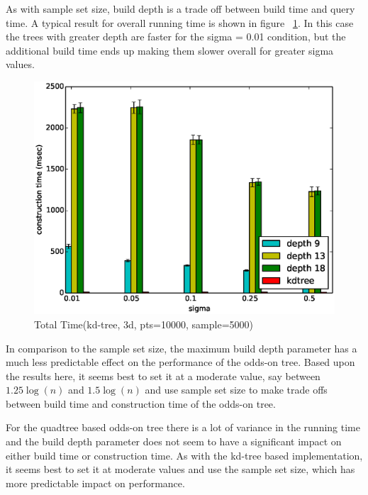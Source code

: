 \documentclass[mcs]{scsthesis}
\begin{document}
As with sample set size, build depth is a trade off between build time and query
time. A typical result for overall running time is shown in figure
~\ref{fig:max_build_depth_total}. In this case the trees with greater depth are
faster for the sigma = 0.01 condition, but the additional build time ends up
making them slower overall for greater sigma values. 

\begin{figure}
\begin{center}
\includegraphics[scale=0.5]{diagrams/kt_3d_pts10000_sample5000_ctime.eps}
\caption{Total Time(kd-tree, 3d, pts=10000, sample=5000)}
\label{fig:max_build_depth_total}
\end{center}
\end{figure}

In comparison to the sample set size, the maximum build depth parameter has
a much less predictable effect on the performance of the odds-on tree. Based
upon the results here, it seems best to set it at a moderate value, say between
$1.25\log(n)$ and $1.5\log(n)$ and use sample set size to make trade offs
between build time and construction time of the odds-on tree.

For the quadtree based odds-on tree there is a lot of variance in the running
time and the build depth parameter does not seem to have a significant impact
on either build time or construction time. As with the kd-tree based
implementation, it seems best to set it at moderate values and use the sample
set size, which has more predictable impact on performance.
\end{document}
